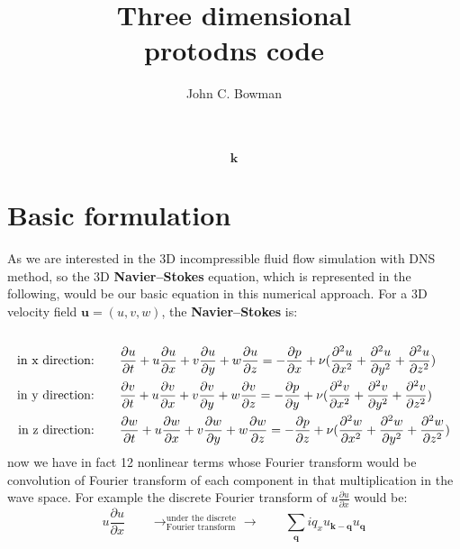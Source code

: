 \documentclass[10pt]{article}
\title{\huge{\textbf{Three dimensional  \\ \vspace{1cm} protodns code}}}
\author{John C. Bowman}
\date{}
\def\k{\bm{k}}
\def\q{\bm{q}}
\def\u{\bm{u}}
\begin{document}
\maketitle

\begin{equation}
\k
\end{equation}

\section{Basic formulation}
As we are interested in the 3D incompressible fluid flow simulation with DNS method, so the 3D \textbf{Navier--Stokes} equation, which is represented in the following, would be our basic equation in this numerical approach. For a 3D velocity field $\u=(u,v,w)$, the \textbf{Navier--Stokes} is:\\
\\
%
\begin{align}
\text{in x direction:}\qquad &\frac{\partial u}{\partial t} + u\frac{\partial u}{\partial x} + v\frac{\partial u}{\partial y} + w\frac{\partial u}{\partial z} = - \frac{\partial p}{\partial x} + \nu(\frac{\partial^2 u}{\partial x^2}+\frac{\partial^2 u}{\partial y^2}+\frac{\partial^2 u}{\partial z^2})        \notag 
\\
\text{in y direction:}\qquad &\frac{\partial v}{\partial t} + u\frac{\partial v}{\partial x} + v\frac{\partial v}{\partial y} + w\frac{\partial v}{\partial z} = - \frac{\partial p}{\partial y} + \nu(\frac{\partial^2 v}{\partial x^2}+\frac{\partial^2 v}{\partial y^2}+\frac{\partial^2 v}{\partial z^2}) 		         
\\
\text{in z direction:}\qquad &\frac{\partial w}{\partial t} + u\frac{\partial w}{\partial x} + v\frac{\partial w}{\partial y} + w\frac{\partial w}{\partial z} = - \frac{\partial p}{\partial z} + \nu(\frac{\partial^2 w}{\partial x^2}+\frac{\partial^2 w}{\partial y^2}+\frac{\partial^2 w}{\partial z^2})         \notag
\end{align}
%
now we have in fact 12 nonlinear terms whose Fourier transform would be convolution of Fourier transform of each component in that multiplication in the wave space. For example the discrete Fourier transform of $u\frac{\partial u}{\partial x}$ would be:
%
\begin{equation}
u\frac{\partial u}{\partial x} \qquad\rightarrow^{\text{under the discrete}}_{\text{Fourier transform}}\rightarrow\qquad \sum_{\q}{iq_{x}u_{\k - \q}u_{\q}}
\end{equation}
\end{document}
